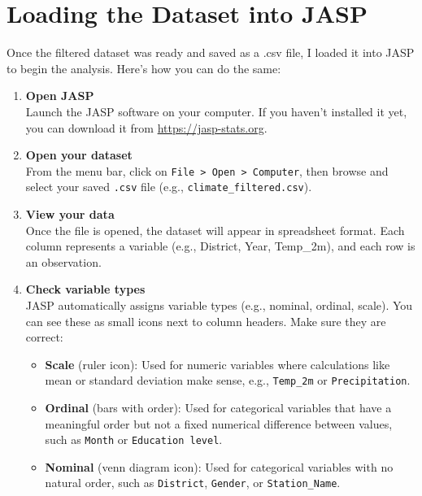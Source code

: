 \section{Loading the Dataset into JASP}
Once the filtered dataset was ready and saved as a .csv file, I loaded it into JASP to begin the analysis. Here's how you can do the same:

\begin{enumerate}
\item \textbf{Open JASP}\\
Launch the JASP software on your computer. If you haven’t installed it yet, you can download it from \url{https://jasp-stats.org}.

\item \textbf{Open your dataset} \\
From the menu bar, click on \texttt{File > Open > Computer}, then browse and select your saved \texttt{.csv} file (e.g., \texttt{climate\_filtered.csv}).

\item \textbf{View your data} \\
Once the file is opened, the dataset will appear in spreadsheet format. Each column represents a variable (e.g., District, Year, Temp\_2m), and each row is an observation.

\item \textbf{Check variable types}\\
JASP automatically assigns variable types (e.g., nominal, ordinal, scale). You can see these as small icons next to column headers. Make sure they are correct:
\begin{itemize}
    \item \textbf{Scale} (ruler icon): Used for numeric variables where calculations like mean or standard deviation make sense, e.g., \texttt{Temp\_2m} or \texttt{Precipitation}.
    
    \item \textbf{Ordinal} (bars with order): Used for categorical variables that have a meaningful order but not a fixed numerical difference between values, such as \texttt{Month} or \texttt{Education level}.
    
    \item \textbf{Nominal} (venn diagram icon): Used for categorical variables with no natural order, such as \texttt{District}, \texttt{Gender}, or \texttt{Station\_Name}.
\end{itemize}

\end{enumerate}

